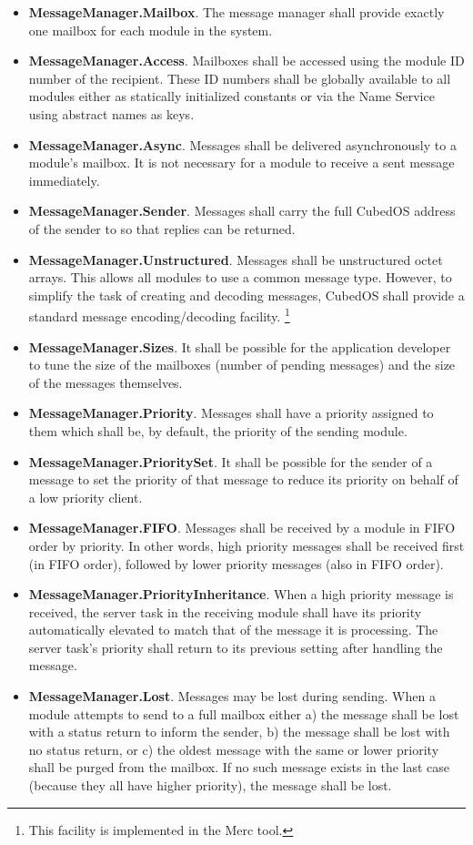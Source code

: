 \begin{itemize}
\item \textbf{MessageManager.Mailbox}. The message manager shall provide exactly one mailbox for
  each module in the system.
\item \textbf{MessageManager.Access}. Mailboxes shall be accessed using the module ID number of
  the recipient. These ID numbers shall be globally available to all modules either as statically
  initialized constants or via the Name Service using abstract names as keys.
\item \textbf{MessageManager.Async}. Messages shall be delivered asynchronously to a module's
  mailbox. It is not necessary for a module to receive a sent message immediately.
\item \textbf{MessageManager.Sender}. Messages shall carry the full CubedOS address of the
  sender to so that replies can be returned.
\item \textbf{MessageManager.Unstructured}. Messages shall be unstructured octet arrays. This
  allows all modules to use a common message type. However, to simplify the task of creating and
  decoding messages, CubedOS shall provide a standard message encoding/decoding facility.
  \footnote{This facility is implemented in the Merc tool.}
\item \textbf{MessageManager.Sizes}. It shall be possible for the application developer to tune
  the size of the mailboxes (number of pending messages) and the size of the messages
  themselves.
\item \textbf{MessageManager.Priority}. Messages shall have a priority assigned to them which
  shall be, by default, the priority of the sending module.
\item \textbf{MessageManager.PrioritySet}. It shall be possible for the sender of a message to
  set the priority of that message to reduce its priority on behalf of a low priority client.
\item \textbf{MessageManager.FIFO}. Messages shall be received by a module in FIFO order by
  priority. In other words, high priority messages shall be received first (in FIFO order),
  followed by lower priority messages (also in FIFO order).
\item \textbf{MessageManager.PriorityInheritance}. When a high priority message is received, the
  server task in the receiving module shall have its priority automatically elevated to match
  that of the message it is processing. The server task's priority shall return to its previous
  setting after handling the message. 
\item \textbf{MessageManager.Lost}. Messages may be lost during sending. When a module attempts
  to send to a full mailbox either a) the message shall be lost with a status return to inform
  the sender, b) the message shall be lost with no status return, or c) the oldest message with
  the same or lower priority shall be purged from the mailbox. If no such message exists in the
  last case (because they all have higher priority), the message shall be lost.
\end{itemize}

